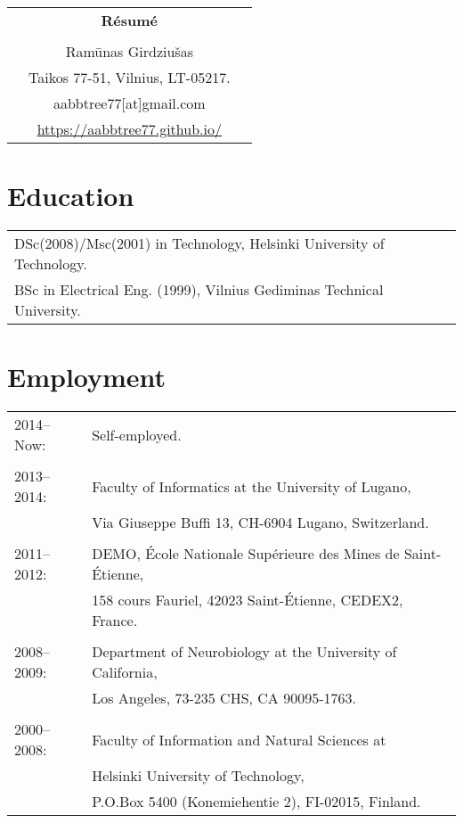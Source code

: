 \documentclass[a4paper,11pt]{article}
\begin{document}
\thispagestyle{empty}

%
%
\begin{center}
\begin{tabular}{ccc}
&\Large \textbf{R\'{e}sum\'{e}}&\\
\\
& Ram\={u}nas Girdziu\v{s}as &\\  
& Taikos 77-51, Vilnius, LT-05217. &\\
& aabbtree77[at]gmail.com &\\
& \url{https://aabbtree77.github.io/}
\end{tabular}
\end{center}
%
\section*{Education}
%
\begin{tabular}{ll}
        DSc(2008)/Msc(2001) in Technology, Helsinki University of Technology. \\
        BSc in Electrical Eng. (1999), Vilnius Gediminas Technical University. 
\end{tabular}
%
\section*{Employment}
%
\begin{tabular}{ll}
2014--Now: & Self-employed.\\
           & \\
2013--2014: & Faculty of Informatics at the University of Lugano,\\
                        & Via Giuseppe Buffi 13, CH-6904 Lugano, Switzerland. \\
&\\
2011--2012: & DEMO, \'{E}cole Nationale Sup\'{e}rieure des Mines de Saint-\'{E}tienne,\\
&158 cours Fauriel, 42023 Saint-\'Etienne, CEDEX2, France. \\
&\\
2008--2009: & Department of Neurobiology at the University of California,\\
&Los Angeles, 73-235 CHS, CA 90095-1763. \\
&\\
2000--2008: & Faculty of Information and Natural Sciences at\\
            & Helsinki University of Technology,\\ 
&  P.O.Box 5400 (Konemiehentie 2), FI-02015, Finland. \\
\end{tabular}
\end{document}
